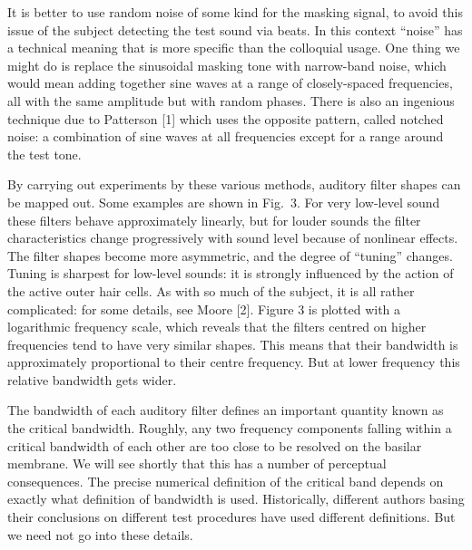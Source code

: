   It is better to use random noise of some kind for the masking signal, to 
  avoid this issue of the subject detecting the test sound via beats. In this 
  context ``noise'' has a technical meaning that is more specific than the 
  colloquial usage. One thing we might do is replace the sinusoidal masking 
  tone with narrow-band noise, which would mean adding together sine waves at a 
  range of closely-spaced frequencies, all with the same amplitude but with 
  random phases. There is also an ingenious technique due to Patterson [1] 
  which uses the opposite pattern, called notched noise: a combination of sine 
  waves at all frequencies except for a range around the test tone. 

  By carrying out experiments by these various methods, auditory filter shapes 
  can be mapped out. Some examples are shown in Fig.\ 3. For very low-level 
  sound these filters behave approximately linearly, but for louder sounds the 
  filter characteristics change progressively with sound level because of 
  nonlinear effects. The filter shapes become more asymmetric, and the degree 
  of ``tuning'' changes. Tuning is sharpest for low-level sounds: it is 
  strongly influenced by the action of the active outer hair cells. As with so 
  much of the subject, it is all rather complicated: for some details, see 
  Moore [2]. Figure 3 is plotted with a logarithmic frequency scale, which 
  reveals that the filters centred on higher frequencies tend to have very 
  similar shapes. This means that their bandwidth is approximately proportional 
  to their centre frequency. But at lower frequency this relative bandwidth 
  gets wider. 


  The bandwidth of each auditory filter defines an important quantity known as 
  the critical bandwidth. Roughly, any two frequency components falling within 
  a critical bandwidth of each other are too close to be resolved on the 
  basilar membrane. We will see shortly that this has a number of perceptual 
  consequences. The precise numerical definition of the critical band depends 
  on exactly what definition of bandwidth is used. Historically, different 
  authors basing their conclusions on different test procedures have used 
  different definitions. But we need not go into these details. 


